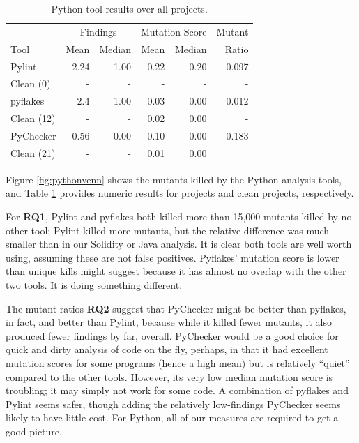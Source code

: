 \begin{table}
  \begin{tabular}{l|r|r|r|r|r}
    & \multicolumn{2}{|c|}{Findings} & \multicolumn{2}{|c|}{Mutation Score}  & Mutant \\
    Tool & Mean & Median & Mean & Median & Ratio\\
    \hline
    \hline
    Pylint & 2.24 & 1.00 & 0.22 & 0.20 & 0.097 \\
    Clean (0) & - & - & - & - & - \\
    \hline
    pyflakes & 2.4 & 1.00 & 0.03 & 0.00 & 0.012 \\
    Clean (12) & - & - & 0.02 & 0.00 & - \\
    \hline
    PyChecker & 0.56& 0.00 & 0.10 & 0.00 &  0.183 \\
    Clean (21) & - & - & 0.01 & 0.00 \\
    \hline
  \end{tabular}
  \caption{Python tool results over all projects.}
  \label{tab:scorepython}
\end{table}


Figure \ref{fig:pythonvenn} shows the mutants killed by the Python analysis tools, and Table \ref{tab:scorepython} provides numeric results for projects and clean projects, respectively.

For {\bf RQ1}, Pylint and pyflakes both killed more than 15,000 mutants killed by no other tool; Pylint killed more mutants, but the relative difference was much smaller than in our Solidity or Java analysis.  It is clear both tools are well worth using, assuming these are not false positives.  Pyflakes' mutation score is lower than unique kills might suggest because it has almost no overlap with the other two tools.  It is doing something different.

The mutant ratios {\bf RQ2} suggest that PyChecker might be better than pyflakes, in fact, and better than Pylint, because while it killed fewer mutants, it also produced fewer findings by far, overall.  PyChecker would be a good choice for quick and dirty analysis of code on the fly, perhaps, in that it had excellent mutation scores for some programs (hence a high mean) but is relatively ``quiet'' compared to the other tools.  However, its very low median mutation score is troubling; it may simply not work for some code.  A combination of pyflakes and Pylint seems safer, though adding the relatively low-findings PyChecker seems likely to have little cost.  For Python, all of our measures are required to get a good picture.

